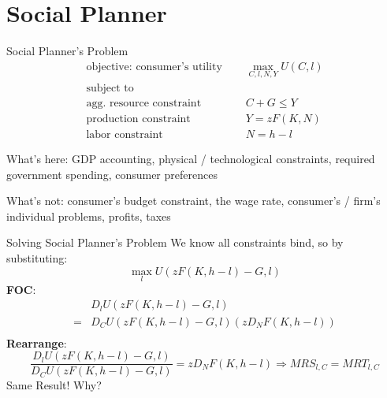 \documentclass[11pt,aspectratio=169,usenames,dvipsnames]{beamer}
\let\tempone\itemize
\let\temptwo\enditemize
\renewenvironment{itemize}{\tempone\addtolength{\itemsep}{\fill}}{\temptwo}
\begin{document}
\section{Social Planner}
\label{sec:Social_Planner_s_Problem}

\begin{frame}{Social Planner's Problem}
\label{slide:Social_Planner_s_Problem}
    \begin{align*}
        \text{objective: consumer's utility } \quad
            & \max_{C, l, N, Y} U( C, l )
        \\
        \text{subject to} \quad
            &
        \\
        \text{agg. resource constraint} \quad
            &  C + G \le Y
        \\
        \text{production constraint} \quad
            & Y = z F( K, N )
        \\
        \text{labor constraint} \quad
            & N = h - l
    \end{align*}
    \begin{itemize}
        \item \alert{What's here}: GDP accounting, physical / technological constraints, required government spending, consumer preferences
        \item \alert{What's not}: consumer's budget constraint, the wage rate, consumer's / firm's individual problems, profits, taxes
    \end{itemize}
\end{frame}

\begin{frame}{Solving Social Planner's Problem}
\label{slide:Solving_Social_Planner_s_Problem}
    We know all constraints bind, so by substituting:
    \begin{equation}
    \label{eq:SPPSolve}
        \max_{l} U( z F( K, h-l ) - G, l )
    \end{equation}
    \textbf{FOC}:
    \begin{equation}
    \label{eq:SPPFOC}
        \begin{split}
                & D_{l} U( z F( K, h-l ) - G, l)
            \\
               = &  D_{C}U( z F( K, h-l ) - G, l ) ( z D_{N} F( K, h-l ) )
            \\
        \end{split}
    \end{equation}
    \textbf{Rearrange}:
    \begin{equation}
    \label{eq:SPPRearrange}
        \frac{D_{l} U( z F( K, h-l ) - G, l)}{D_{C}U( z F( K, h-l ) - G, l )} = z D_{N} F( K, h-l ) \Rightarrow MRS_{l, C}  = MRT_{l, C}
    \end{equation}
    Same Result! Why?
\end{frame}
\end{document}

